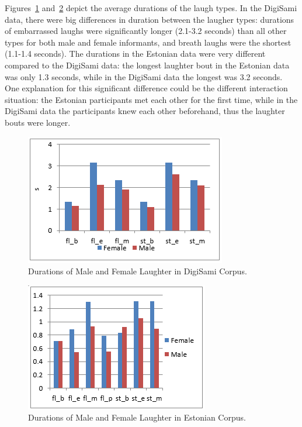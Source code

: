 \documentclass[10pt,journal,compsoc]{IEEEtran}
\begin{document}
Figures~\ref{fig:duration-digisami} and~\ref{fig:duration-estonian} depict the average durations of the laugh types. In the DigiSami data, there were big differences in duration between the laugher types: durations of embarrassed laughs were significantly longer (2.1-3.2 seconds) than all other types for both male and female informants, and breath laughs were the shortest (1.1-1.4 seconds). The durations in the Estonian data were very different compared to the DigiSami data: the longest laughter bout in the Estonian data was only 1.3 seconds, while in the DigiSami data the longest was 3.2 seconds. One explanation for this significant difference could be the different interaction situation: the Estonian participants met each other for the first time, while in the DigiSami data the participants knew each other beforehand, thus the laughter bouts were longer.

\begin{figure}[!t]
\centering
\includegraphics[width=1\linewidth]{images/Duration-DigiSami.png}
\caption{Durations of Male and Female Laughter in DigiSami Corpus.}
\label{fig:duration-digisami}
\end{figure}

\begin{figure}[!t]
\centering
\includegraphics[width=1\linewidth]{images/Duration-MINT.png}
\caption{Durations of Male and Female Laughter in Estonian Corpus.}
\label{fig:duration-estonian}
\end{figure}
\end{document}
